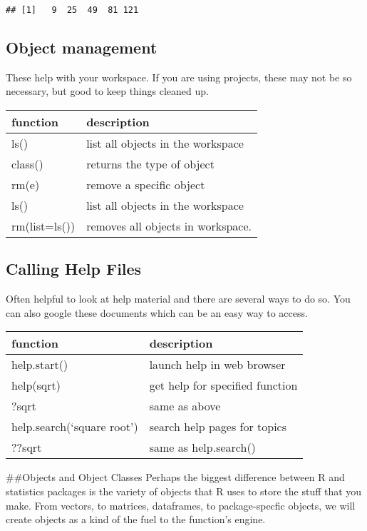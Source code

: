 \documentclass[
]{article}
\begin{document}
\begin{verbatim}
## [1]   9  25  49  81 121
\end{verbatim}

\hypertarget{object-management}{%
\subsection{Object management}\label{object-management}}

These help with your workspace. If you are using projects, these may not
be so necessary, but good to keep things cleaned up.

\begin{longtable}[]{@{}ll@{}}
\toprule
function & description \\
\midrule
\endhead
ls() & list all objects in the workspace \\
class() & returns the type of object \\
rm(e) & remove a specific object \\
ls() & list all objects in the workspace \\
rm(list=ls()) & removes all objects in workspace. \\
\bottomrule
\end{longtable}

\hypertarget{calling-help-files}{%
\subsection{Calling Help Files}\label{calling-help-files}}

Often helpful to look at help material and there are several ways to do
so. You can also google these documents which can be an easy way to
access.

\begin{longtable}[]{@{}ll@{}}
\toprule
function & description \\
\midrule
\endhead
help.start() & launch help in web browser \\
help(sqrt) & get help for specified function \\
?sqrt & same as above \\
help.search(`square root') & search help pages for topics \\
??sqrt & same as help.search() \\
\bottomrule
\end{longtable}

\#\#Objects and Object Classes Perhaps the biggest difference between R
and statistics packages is the variety of objects that R uses to store
the stuff that you make. From vectors, to matrices, dataframes, to
package-specfic objects, we will create objects as a kind of the fuel to
the function's engine.
\end{document}
